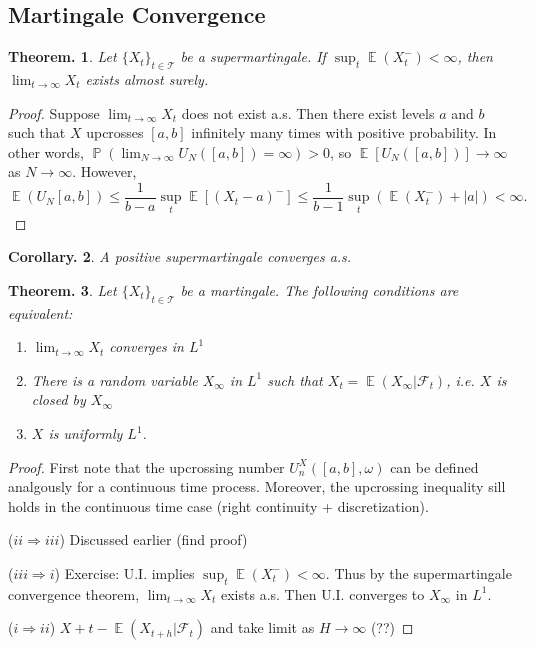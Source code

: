 \documentclass[11pt, a4paper]{memoir}
\newcommand{\imp}[2]{($#1\Rightarrow#2$)\hspace{0.2cm}}
\theoremstyle{change}
\newtheorem{theorem}{Theorem.}[section]
\newtheorem{corollary}[theorem]{Corollary.}
\theoremstyle{plain}
\theoremstyle{nonumberplain}
\newtheorem{proof}{Proof}
\DeclareMathOperator{\pr}{{\mathbb{P}}}
\DeclareMathOperator{\E}{{\mathbb{E}}}
\numberwithin{equation}{section}
\begin{document}
\subsection{Martingale Convergence}
\begin{theorem}
    Let $\{X_t\}_{t\in\mathcal{T}}$ be a supermartingale.
    If $\sup_t\E(X_t^-)<\infty$, then $\lim_{t\to\infty}X_t$ exists almost surely.
\end{theorem}
\begin{proof}
    Suppose $\lim_{t\to\infty}X_t$ does not exist a.s.
    Then there exist levels $a$ and $b$ such that $X$ upcrosses $[a,b]$ infinitely many times with positive probability.
    In other words, $\pr(\lim_{N\to\infty}U_N([a,b])=\infty)>0$, so $\E[U_N([a,b])]\to\infty$ as $N\to\infty$.
    However,
    \begin{equation*}
        \E(U_N[a,b])\leq\frac{1}{b-a}\sup_t\E[(X_t-a)^-]\leq\frac{1}{b-1}\sup_t(\E(X_t^-)+|a|)<\infty.
    \end{equation*}
\end{proof}
\begin{corollary}
    A positive supermartingale converges a.s.
\end{corollary}
\begin{theorem}
    Let $\{X_t\}_{t\in\mathcal{T}}$ be a martingale.
    The following conditions are equivalent:
    \begin{enumerate}[nl,r]
        \item $\lim_{t\to\infty}X_t$ converges in $L^1$
        \item There is a random variable $X_\infty$ in $L^1$ such that $X_t=\E(X_\infty|\mathcal{F}_t)$, i.e. $X$ is closed by $X_\infty$
        \item $X$ is uniformly $L^1$.
    \end{enumerate}
\end{theorem}
\begin{proof}
    First note that the upcrossing number $U_n^X([a,b],\omega)$ can be defined analgously for a continuous time process.
    Moreover, the upcrossing inequality sill holds in the continuous time case (right continuity + discretization).

    \imp{ii}{iii}
    Discussed earlier (find proof)

    \imp{iii}{i}
    Exercise: U.I. implies $\sup_t\E(X_t^-)<\infty$.
    Thus by the supermartingale convergence theorem, $\lim_{t\to\infty}X_t$ exists a.s.
    Then U.I. converges to $X_\infty$ in $L^1$.

    \imp{i}{ii}
    $X+t-\E(X_{t+h}|\mathcal{F}_t)$ and take limit as $H\to\infty$ (??)
\end{proof}
\end{document}
